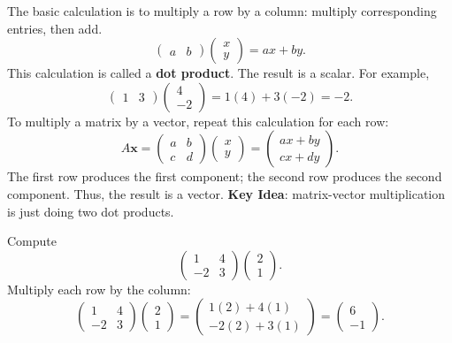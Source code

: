 \documentclass[10pt,letterpaper]{article}
\begin{document}
The basic calculation is to multiply a row by a column:
multiply corresponding entries, then add.
\[
\begin{pmatrix}a&b\end{pmatrix}
\begin{pmatrix}x\\y\end{pmatrix}
=ax+by.
\]
This calculation is called a \textbf{dot product}.
The result is a scalar. For example,
\[
\begin{pmatrix}1&3\end{pmatrix}
\begin{pmatrix}4\\-2\end{pmatrix}
=1(4)+3(-2)=-2.
\]
To multiply a matrix by a vector, repeat this
calculation for each row:
\[
A\mathbf{x}
=
\begin{pmatrix}
a&b\\
c&d
\end{pmatrix}
\begin{pmatrix}
x\\y
\end{pmatrix}
=
\begin{pmatrix}
ax+by\\
cx+dy
\end{pmatrix}.
\]
The first row produces the first component;
the second row produces the second component.
Thus, the result is a vector. \textbf{Key Idea}: matrix-vector multiplication is just doing two dot products.

\begin{example}[4]{
Compute
\[
\begin{pmatrix}
1&4\\
-2&3
\end{pmatrix}
\begin{pmatrix}2\\1\end{pmatrix}.
\]
}
Multiply each row by the column:
\[
\begin{pmatrix}
1&4\\
-2&3
\end{pmatrix}
\begin{pmatrix}2\\1\end{pmatrix}
=
\begin{pmatrix}
1(2)+4(1)\\
-2(2)+3(1)
\end{pmatrix}
=
\boxed{
\begin{pmatrix}6\\-1\end{pmatrix}.
}
\]
\end{example}
\end{document}
